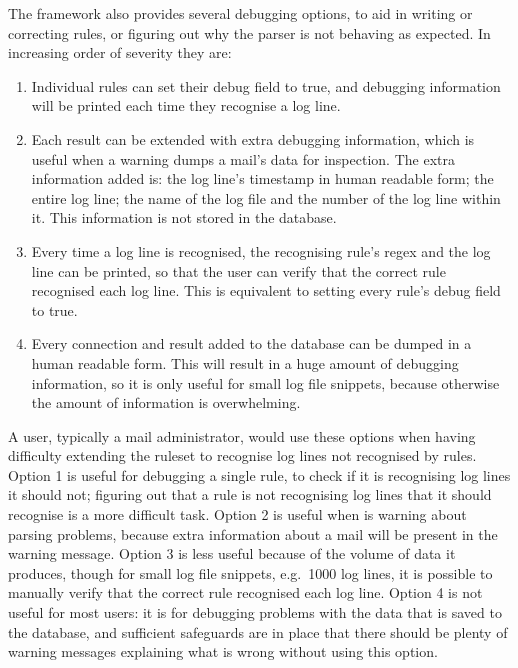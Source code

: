 The framework also provides several debugging options, to aid in writing or
correcting rules, or figuring out why the parser is not behaving as
expected.  In increasing order of severity they are:

\begin{enumerate}

    \item Individual rules can set their debug field to true, and debugging
        information will be printed each time they recognise a log line.

    \item Each result can be extended with extra debugging information,
        which is useful when a warning dumps a mail's data for inspection.
        The extra information added is: the log line's timestamp in human
        readable form; the entire log line; the name of the log file and
        the number of the log line within it.  This information is not
        stored in the database.

    \item Every time a log line is recognised, the recognising rule's regex
        and the log line can be printed, so that the user can verify that
        the correct rule recognised each log line.  This is equivalent to
        setting every rule's debug field to true.

    \item Every connection and result added to the database can be dumped
        in a human readable form.  This will result in a huge amount of
        debugging information, so it is only useful for small log file
        snippets, because otherwise the amount of information is
        overwhelming.

\end{enumerate}

A user, typically a mail administrator, would use these options when having
difficulty extending the ruleset to recognise log lines not recognised by
\parsernames{} \numberOFrules{} rules.  Option 1 is useful for debugging a
single rule, to check if it is recognising log lines it should not;
figuring out that a rule is not recognising log lines that it should
recognise is a more difficult task.  Option 2 is useful when \parsername{}
is warning about parsing problems, because extra information about a mail
will be present in the warning message.  Option 3 is less useful because of
the volume of data it produces, though for small log file snippets, e.g.\
1000 log lines, it is possible to manually verify that the correct rule
recognised each log line.  Option 4 is not useful for most users: it is for
debugging problems with the data that is saved to the database, and
sufficient safeguards are in place that there should be plenty of warning
messages explaining what is wrong without using this option.

